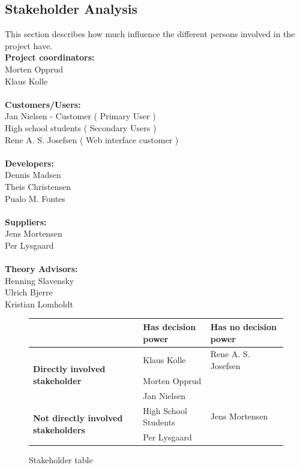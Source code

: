 \subsection{Stakeholder Analysis}
This section describes how much influence the different persons
involved in the project have.\\[0.2cm]
\textbf{Project coordinators:}\\ Morten Opprud\\ Klaus Kolle\\
\\
\textbf{Customers/Users:}\\
Jan Nielsen - Customer ( Primary User )\\
High school students ( Secondary Users )\\
Rene A. S. Josefsen ( Web interface customer )\\
\\
\textbf{Developers:}\\
Dennis Madsen\\
Theis Christensen\\
Pualo M. Fontes\\
\\
\textbf{Suppliers:}\\
Jens Mortensen\\
Per Lysgaard\\
\\
\textbf{Theory Advisors:}\\
Henning Slavensky\\
Ulrich Bjerre\\
Kristian Lomholdt\\

\begin{figure}[h!]
 \begin{center}
  \begin{tabular}{| l | l | l |}
   \hline
    & \textbf{Has decision power} & \textbf{Has no decision power} \\ \hline
    \multirow{3}{*}{\textbf{Directly involved stakeholder}} 
    	& Klaus Kolle & Rene A. S. Josefsen\\ 
    	& Morten Opprud &  \\ 
    	& Jan Nielsen &  \\ \hline
    \multirow{2}{*}{\textbf{Not directly involved stakeholders}} 
    	& High School Students & Jens Mortensen\\
    	& Per Lysgaard & \\ \hline
   \end{tabular}
  \end{center}
 \caption{Stakeholder table}
\end{figure}

